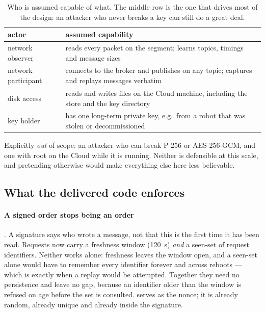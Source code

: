 \begin{table}[!t]
\caption{Who is assumed capable of what. The middle row is the one that
drives most of the design: an attacker who never breaks a key can still
do a great deal.}
\label{tab:threats}
\centering\footnotesize
\begin{tabular}{@{}p{}p{}@{}}
\toprule
actor & assumed capability \\
\midrule
network observer & reads every packet on the segment; learns topics,
  timings and message sizes \\
network participant & connects to the broker and publishes on any topic;
  captures and replays messages verbatim \\
disk access & reads and writes files on the Cloud machine, including the
  store and the key directory \\
key holder & has one long-term private key, e.g.\ from a robot that was
  stolen or decommissioned \\
\bottomrule
\end{tabular}
\end{table}

Explicitly \emph{out} of scope: an attacker who can break P-256 or
AES-256-GCM, and one with root on the Cloud while it is running. Neither
is defensible at this scale, and pretending otherwise would make
everything else here less believable.

\subsection{What the delivered code enforces}

\paragraph{A signed order stops being an order}
. A signature says who wrote a message, not
that this is the first time it has been read. Requests now carry a
freshness window (\SI{120}{s}) \emph{and} a seen-set of request
identifiers. Neither works alone: freshness leaves the window open, and
a seen-set alone would have to remember every identifier forever and
across reboots --- which is exactly when a replay would be attempted.
Together they need no persistence and leave no gap, because an
identifier older than the window is refused on age before the set is
consulted.  serves as the nonce; it is already
random, already unique and already inside the signature.

